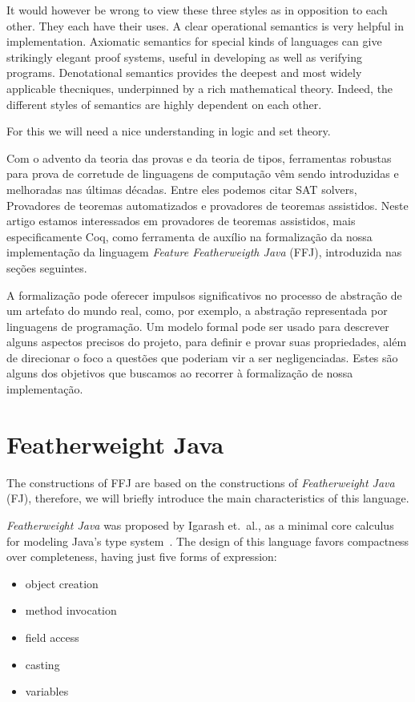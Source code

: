 It would however be wrong to view these three styles as in opposition to
each other. They each have their uses. A clear operational semantics is very
helpful in implementation. Axiomatic semantics for special kinds of
languages can give strikingly elegant proof systems, useful in developing as
well as verifying programs. Denotational semantics provides the deepest and
most widely applicable thecniques, underpinned by a rich mathematical
theory. Indeed, the different styles  of semantics are highly dependent on
each other. 

For this we will need a nice understanding in logic and set theory.

Com o advento da teoria das provas e da teoria de tipos\cite{martinlof},
ferramentas robustas para prova de corretude de linguagens de computação vêm
sendo introduzidas e melhoradas nas últimas décadas. Entre eles podemos citar
SAT solvers, Provadores de teoremas automatizados e provadores de teoremas
assistidos.  Neste artigo estamos interessados em provadores de teoremas
assistidos, mais especificamente Coq, como ferramenta de auxílio na formalização
da nossa implementação da linguagem \textit{Feature Featherweigth Java} (FFJ),
introduzida nas seções seguintes. 

A formalização pode oferecer impulsos significativos no processo de abstração de
um artefato do mundo real, como, por exemplo, a abstração representada por
linguagens de programação.  Um modelo formal pode ser usado para descrever
alguns aspectos precisos do projeto, para definir e provar suas propriedades,
além de direcionar o foco a questões que poderiam vir a ser negligenciadas.
Estes são alguns dos objetivos que buscamos ao recorrer à formalização de nossa
implementação.

\section{Featherweight Java}

The constructions of FFJ are based on the constructions of \textit{Featherweight
Java} (FJ), therefore, we will briefly introduce the main characteristics of
this language.

\textit{Featherweight Java} was proposed by Igarash et.\ al., as a minimal core
calculus for modeling Java's type system~\cite{Igarashi99featherweightjava}. The 
design of this language favors compactness over completeness, having just five 
forms of expression:
\begin{itemize}
    \item object creation
    \item method invocation
    \item field access
    \item casting 
    \item variables
\end{itemize}

